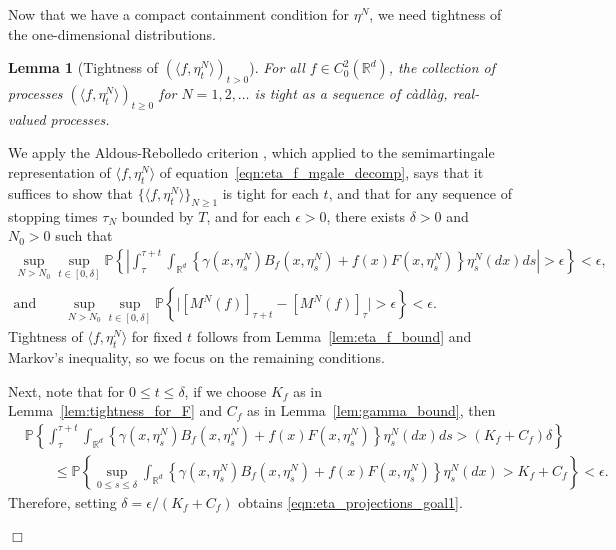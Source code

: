 \documentclass[12pt]{article}
\newenvironment {proof}{{\noindent\bf Proof }}{\hfill $\Box$ \medskip}
\newtheorem{lemma}[theorem]{Lemma}
\newcommand{\IP}{\mathbb P}
\newcommand{\IR}{\mathbb R}
\begin{document}
Now that we have a compact containment condition for $\eta^N$,
we need tightness of the one-dimensional distributions.

\begin{lemma}[Tightness of $(\langle f, \eta^{N}_t \rangle )_{t>0}$]
    \label{lem:eta_projections_tightness}
For all $f \in C^{2}_{0}(\mathbb{R}^d)$, 
the collection of processes
$(\langle f, \eta^{N}_t \rangle)_{t \geq 0}$
for $N = 1, 2, \ldots$ is tight as a sequence of c\`adl\`ag, real-valued processes.
\end{lemma}

\begin{proof}
We apply the Aldous-Rebolledo criterion \citep{rebolledo:1980}, which 
applied to the semimartingale representation of $\langle f, \eta^N_t\rangle$
of equation~\eqref{eqn:eta_f_mgale_decomp},
says that it suffices to show that 
$\{\langle f, \eta^N_t \rangle\}_{N \ge 1}$ is tight for each $t$, and that
for any sequence of stopping times $\tau_N$ bounded by $T$,
and for each $\epsilon > 0$, there exists $\delta > 0$ and $N_0 > 0$ such that 
\begin{gather}
        \label{eqn:eta_projections_goal1}
    \sup_{N > N_0}
    \sup_{t \in [0, \delta]}
    \IP\left\{\left|
            \int_\tau^{\tau + t}
            \int_{\IR^d}
            \left\{
                \gamma(x, \eta^N_s) B_f(x, \eta^N_s)
                + f(x) F(x, \eta^N_s)
            \right\} 
            \eta^N_s(dx)
            ds
        \right|> \epsilon \right\}
        < \epsilon ,
    \\ \text{and} \qquad
        \label{eqn:eta_projections_goal2}
    \sup_{N > N_0}
    \sup_{t \in [0, \delta]}
    \IP\left\{\big|
        [M^{N}(f)]_{\tau + t} 
            - [M^{N}(f)]_\tau \big|
        > \epsilon
    \right\}
    < \epsilon.
\end{gather}
Tightness of $\langle f, \eta^N_t\rangle$ for fixed $t$
follows from Lemma~\ref{lem:eta_f_bound} and Markov's inequality,
so we focus on the remaining conditions.

Next, note that for $0 \le t \le \delta$,
if we choose $K_f$ as in Lemma~\ref{lem:tightness_for_F}
and $C_f$ as in Lemma~\ref{lem:gamma_bound},
then
\begin{align*}
    &
    \IP\left\{
        \int_\tau^{\tau + t}
        \int_{\IR^d}
        \left\{
            \gamma(x, \eta^N_s) B_f(x, \eta^N_s)
            + f(x) F(x, \eta^N_s)
        \right\} 
        \eta^N_s(dx)
        ds
        > (K_f + C_f) \delta
    \right\}
    \\ & \qquad \le
    \IP\left\{
        \sup_{0 \le s \le \delta}
        \int_{\IR^d} \left\{
            \gamma(x, \eta^N_s) B_f(x, \eta^N_s)
            + f(x) F(x, \eta^N_s)
        \right\} \eta^N_s(dx)
        >
        K_f + C_f
    \right\}
    < \epsilon .
\end{align*}
Therefore, setting $\delta = \epsilon / (K_f + C_f)$
obtains \eqref{eqn:eta_projections_goal1}.


\end{proof}
\end{document}
